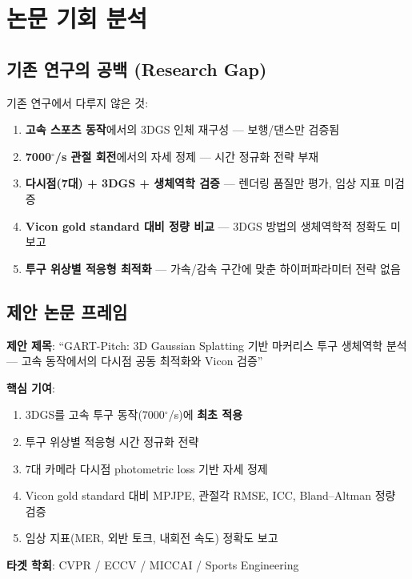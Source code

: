\documentclass[11pt, a4paper]{report}
\begin{document}
\chapter{논문 기회 분석}

\section{기존 연구의 공백 (Research Gap)}

\begin{gapbox}
기존 연구에서 다루지 않은 것:
\begin{enumerate}[nosep]
  \item \textbf{고속 스포츠 동작}에서의 3DGS 인체 재구성 --- 보행/댄스만 검증됨
  \item \textbf{7000$^\circ$/s 관절 회전}에서의 자세 정제 --- 시간 정규화 전략 부재
  \item \textbf{다시점(7대) + 3DGS + 생체역학 검증} --- 렌더링 품질만 평가, 임상 지표 미검증
  \item \textbf{Vicon gold standard 대비 정량 비교} --- 3DGS 방법의 생체역학적 정확도 미보고
  \item \textbf{투구 위상별 적응형 최적화} --- 가속/감속 구간에 맞춘 하이퍼파라미터 전략 없음
\end{enumerate}
\end{gapbox}

\section{제안 논문 프레임}

\begin{noveltybox}
\textbf{제안 제목}: ``GART-Pitch: 3D Gaussian Splatting 기반 마커리스 투구 생체역학 분석 ---
고속 동작에서의 다시점 공동 최적화와 Vicon 검증''

\textbf{핵심 기여}:
\begin{enumerate}[nosep]
  \item 3DGS를 고속 투구 동작(7000$^\circ$/s)에 \textbf{최초 적용}
  \item 투구 위상별 적응형 시간 정규화 전략
  \item 7대 카메라 다시점 photometric loss 기반 자세 정제
  \item Vicon gold standard 대비 MPJPE, 관절각 RMSE, ICC, Bland--Altman 정량 검증
  \item 임상 지표(MER, 외반 토크, 내회전 속도) 정확도 보고
\end{enumerate}

\textbf{타겟 학회}: CVPR / ECCV / MICCAI / Sports Engineering
\end{noveltybox}
\end{document}
